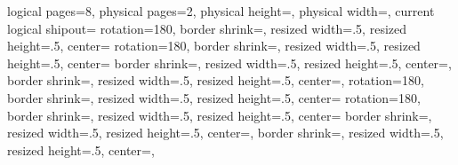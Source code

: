 \usepackage{pgfmorepages}
\usepackage{atbegshi}           %

{%
  \edef\pgfpageoptionheight{\the\paperheight}
  \edef\pgfpageoptionwidth{\the\paperwidth}
  \def\pgfpageoptionborder{0pt}
  \def\pgfpageoptionfirstshipout{1}
}%
{%
  \pgfpagesphysicalpageoptions%
  {%
    logical pages=8,%
    physical pages=2,%
    physical height=\pgfpageoptionheight,%
    physical width=\pgfpageoptionwidth,%
    current logical shipout=\pgfpageoptionfirstshipout%
  }
  {%
    rotation=180,
    border shrink=\pgfpageoptionborder,%
    resized width=.5\pgfphysicalwidth,%
    resized height=.5\pgfphysicalheight,%
    center=\pgfpoint{.25\pgfphysicalwidth}{.75\pgfphysicalheight}%
  }%
  {%
    rotation=180,
    border shrink=\pgfpageoptionborder,%
    resized width=.5\pgfphysicalwidth,%
    resized height=.5\pgfphysicalheight,%
    center=\pgfpoint{.75\pgfphysicalwidth}{.75\pgfphysicalheight}%
  }%
  {%
    border shrink=\pgfpageoptionborder,%
    resized width=.5\pgfphysicalwidth,%
    resized height=.5\pgfphysicalheight,%
    center=\pgfpoint{.25\pgfphysicalwidth}{.25\pgfphysicalheight},%
  }%
  {%
    border shrink=\pgfpageoptionborder,%
    resized width=.5\pgfphysicalwidth,%
    resized height=.5\pgfphysicalheight,%
    center=\pgfpoint{.75\pgfphysicalwidth}{.25\pgfphysicalheight},%
  }%
  {%
    rotation=180,
    border shrink=\pgfpageoptionborder,%
    resized width=.5\pgfphysicalwidth,%
    resized height=.5\pgfphysicalheight,%
    center=\pgfpoint{.25\pgfphysicalwidth}{.75\pgfphysicalheight}%
  }%
  {%
    rotation=180,
    border shrink=\pgfpageoptionborder,%
    resized width=.5\pgfphysicalwidth,%
    resized height=.5\pgfphysicalheight,%
    center=\pgfpoint{.75\pgfphysicalwidth}{.75\pgfphysicalheight}%
  }%
  {%
    border shrink=\pgfpageoptionborder,%
    resized width=.5\pgfphysicalwidth,%
    resized height=.5\pgfphysicalheight,%
    center=\pgfpoint{.25\pgfphysicalwidth}{.25\pgfphysicalheight},%
  }%
  {%
    border shrink=\pgfpageoptionborder,%
    resized width=.5\pgfphysicalwidth,%
    resized height=.5\pgfphysicalheight,%
    center=\pgfpoint{.75\pgfphysicalwidth}{.25\pgfphysicalheight},%
  }%
}

